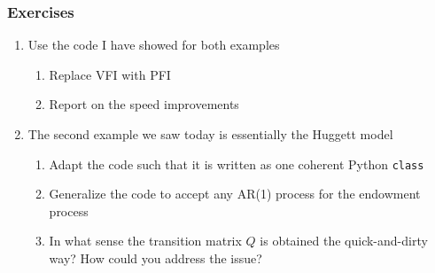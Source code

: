 \documentclass[10pt, aspectratio=1610, natbib, handout]{beamer}
\begin{document}
  \begin{frame}
    \frametitle{Exercises}

    \begin{enumerate}
      \item Use the code I have showed for both examples
        \begin{enumerate}
          \item Replace VFI with PFI
          \item Report on the speed improvements
        \end{enumerate}
      \vfill
      \item The second example we saw today is essentially the Huggett model
        \begin{enumerate}
          \item Adapt the code such that it is written as one coherent Python \texttt{class}
          \item Generalize the code to accept any AR(1) process for the endowment process
          \item In what sense the transition matrix $Q$ is obtained the quick-and-dirty way? How could you address the issue?
        \end{enumerate}
    \end{enumerate}

  \end{frame}
\end{document}
